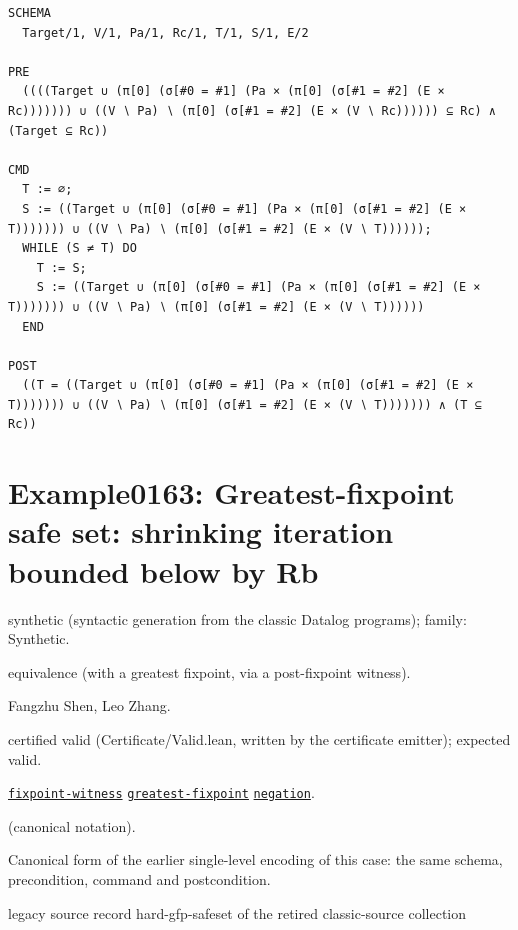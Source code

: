 \documentclass[10pt]{article}
\begin{document}
\begin{Verbatim}[fontsize=\scriptsize,breaklines=true,breakanywhere=true,frame=single,framesep=1.5mm]
SCHEMA
  Target/1, V/1, Pa/1, Rc/1, T/1, S/1, E/2

PRE
  ((((Target ∪ (π[0] (σ[#0 = #1] (Pa × (π[0] (σ[#1 = #2] (E × Rc))))))) ∪ ((V ∖ Pa) ∖ (π[0] (σ[#1 = #2] (E × (V ∖ Rc)))))) ⊆ Rc) ∧ (Target ⊆ Rc))

CMD
  T := ∅;
  S := ((Target ∪ (π[0] (σ[#0 = #1] (Pa × (π[0] (σ[#1 = #2] (E × T))))))) ∪ ((V ∖ Pa) ∖ (π[0] (σ[#1 = #2] (E × (V ∖ T))))));
  WHILE (S ≠ T) DO
    T := S;
    S := ((Target ∪ (π[0] (σ[#0 = #1] (Pa × (π[0] (σ[#1 = #2] (E × T))))))) ∪ ((V ∖ Pa) ∖ (π[0] (σ[#1 = #2] (E × (V ∖ T))))))
  END

POST
  ((T = ((Target ∪ (π[0] (σ[#0 = #1] (Pa × (π[0] (σ[#1 = #2] (E × T))))))) ∪ ((V ∖ Pa) ∖ (π[0] (σ[#1 = #2] (E × (V ∖ T))))))) ∧ (T ⊆ Rc))
\end{Verbatim}

\Needspace{0.45\textheight}

\section{Example0163: Greatest-fixpoint safe set: shrinking iteration bounded below by Rb}\label{case:Example0163}

\begin{description}[leftmargin=2.6cm,style=nextline,itemsep=1pt]

\item[Category] synthetic (syntactic generation from the classic Datalog programs); family: Synthetic.

\item[Kind] equivalence (with a greatest fixpoint, via a post-fixpoint witness).

\item[Contributors] Fangzhu Shen, Leo Zhang.

\item[Status] certified valid (Certificate/Valid.lean, written by the certificate emitter); expected valid.

\item[Tags] \hyperref[tag:fixpoint-witness]{\texttt{fixpoint-witness}} \hyperref[tag:greatest-fixpoint]{\texttt{greatest-fixpoint}} \hyperref[tag:negation]{\texttt{negation}}.

\item[Input]  (canonical notation).

\item[Summary] Canonical form of the earlier single-level encoding of this case: the same schema, precondition, command and postcondition.

\item[Sources] {\raggedright legacy source record hard-gfp-safeset of the retired classic-source collection\par}

\end{description}
\end{document}
